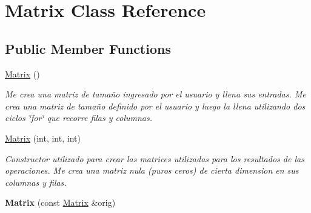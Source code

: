 \hypertarget{class_matrix}{}\section{Matrix Class Reference}
\label{class_matrix}
\subsection*{Public Member Functions}
\begin{DoxyCompactItemize}
\item 
\hyperlink{class_matrix_a2dba13c45127354c9f75ef576f49269b}{Matrix} ()
\begin{DoxyCompactList}\small\item\em Me crea una matriz de tamaño ingresado por el usuario y llena sus entradas. Me crea una matriz de tamaño definido por el usuario y luego la llena utilizando dos ciclos \char`\"{}for\char`\"{} que recorre filas y columnas. \end{DoxyCompactList}\item 
\hyperlink{class_matrix_aeca1d0c59b90eefc898960928486fb5f}{Matrix} (int, int, int)
\begin{DoxyCompactList}\small\item\em Constructor utilizado para crear las matrices utilizadas para los resultados de las operaciones. Me crea una matriz nula (puros ceros) de cierta dimension en sus columnas y filas. \end{DoxyCompactList}\item 
{\bfseries Matrix} (const \hyperlink{class_matrix}{Matrix} \&orig)\hypertarget{class_matrix_a806b603175d91477ca28ccf83ef589ea}{}\label{class_matrix_a806b603175d91477ca28ccf83ef589ea}


\end{DoxyCompactItemize}
